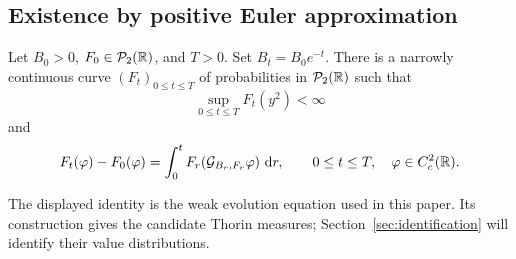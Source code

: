 \subsection{Existence by positive Euler approximation}

\begin{theorem}\label{thm:evolution}
Let \(B_0>0\), \(F_0\in\mathcal P_2(\mathbb R)\), and \(T>0\).
Set \(B_t=B_0e^{-t}\).
There is a narrowly continuous curve \((F_t)_{0\le t\le T}\) of probabilities in \(\mathcal P_2(\mathbb R)\) such that
\begin{equation}
 \sup_{0\le t\le T}F_t(y^2)<\infty
 \label{eq:evolution-second-moment}
\end{equation}
and
\begin{equation}
 F_t(\varphi)-F_0(\varphi)
   =\int_0^t F_r(\mathcal G_{B_r,F_r}\varphi)\,\mathop{}\!\mathrm d r,
 \qquad
 0\le t\le T,\quad \varphi\in C_c^2(\mathbb R).
 \label{eq:evolution-weak-equation}
\end{equation}
\end{theorem}

The displayed identity is the weak evolution equation used in this paper.
Its construction gives the candidate Thorin measures; Section~\ref{sec:identification} will identify their value distributions.

